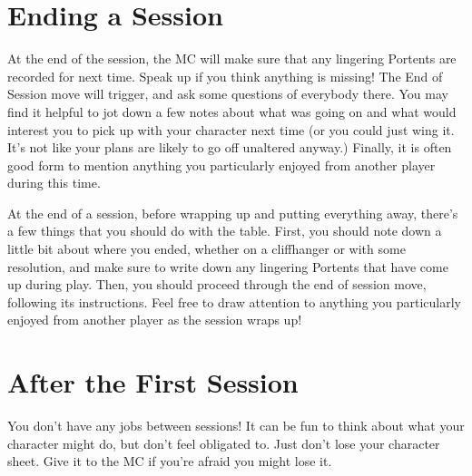 \documentclass[
  oneside,
  statementpaper,
  9pt]{memoir}
\begin{document}
\hypertarget{ending-a-session-1}{%
\section{Ending a Session}\label{ending-a-session-1}}

\begin{Player}

At the end of the session, the MC will make sure that any lingering Portents are recorded for next time. Speak up if you think anything is missing! The End of Session move will trigger, and ask some questions of everybody there. You may find it helpful to jot down a few notes about what was going on and what would interest you to pick up with your character next time (or you could just wing it. It's not like your plans are likely to go off unaltered anyway.) Finally, it is often good form to mention anything you particularly enjoyed from another player during this time.

\end{Player}

\begin{MC}

At the end of a session, before wrapping up and putting everything away, there’s a few things that you should do with the table. First, you should note down a little bit about where you ended, whether on a cliffhanger or with some resolution, and make sure to write down any lingering Portents that have come up during play. Then, you should proceed through the end of session move, following its instructions. Feel free to draw attention to anything you particularly enjoyed from another player as the session wraps up!

\end{MC}

\hypertarget{after-the-first-session}{%
\section{After the First Session}\label{after-the-first-session}}

\begin{Player}

You don't have any jobs between sessions! It can be fun to think about what your character might do, but don't feel obligated to. Just don't lose your character sheet. Give it to the MC if you're afraid you might lose it.

\end{Player}
\end{document}
